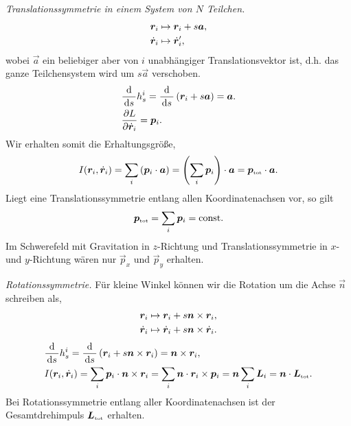 \begin{bsp}
\textit{Translationssymmetrie in einem System von $N$ Teilchen.}
\begin{align*}
&\bm{r}_i \mapsto \bm{r}_i + s\bm{a},\\
&\dot{\bm{r}}_i \mapsto \dot{\bm{r}}_i',
\end{align*}
wobei $\vec{a}$ ein beliebiger aber von $i$ unabhängiger Translationsvektor
ist, d.h. das ganze Teilchensystem wird um $s\vec{a}$ verschoben. 
\begin{align*}
&\frac{\mathrm{d}}{\,\mathrm{d} s\,} h_s^i = \frac{\mathrm{d}}{\,\mathrm{d} s\,} \left(\bm{r}_i + s\bm{a}\right)
= \bm{a}.\\
&\frac{\partial L}{\partial \dot{\bm{r}}_i} = \bm{p}_i. 
\end{align*}
Wir erhalten somit die Erhaltungsgröße,
\begin{align*}
I(\bm{r}_i,\dot{\bm{r}}_i) = \sum_i \left(\bm{p}_i\cdot \bm{a}\right) =
\left(\sum_i \bm{p}_i\right)\cdot\bm{a} = \bm{p}_{\text{\tiny tot}}\cdot\bm{a}.
\end{align*}
Liegt eine Translationssymmetrie entlang allen Koordinatenachsen vor, so	 gilt
\begin{align*}
\bm{p}_{\text{\tiny tot}} = \sum_i \bm{p}_i = \mathrm{const}.
\end{align*}
Im Schwerefeld mit Gravitation in $z$-Richtung und Translationssymmetrie in $x$-
und $y$-Richtung wären nur $\vec{p}_x$ und $\vec{p}_y$ erhalten.\bsphere
\end{bsp}
\begin{bsp}
\textit{Rotationssymmetrie.} Für kleine Winkel können wir die Rotation um
die Achse $\vec{n}$ schreiben als,
\begin{align*}
\bm{r}_i \mapsto \bm{r}_i + s\bm{n}\times\bm{r}_i,\\
\dot{\bm{r}}_i \mapsto \dot{\bm{r}}_i + s\bm{n}\times\dot{\bm{r}}_i.
\end{align*}
\begin{align*}
&\frac{\mathrm{d}}{\,\mathrm{d} s\,} h_s^i = \frac{\mathrm{d}}{\,\mathrm{d} s\,}\left(\bm{r}_i +
s\bm{n}\times\bm{r}_i\right) = \bm{n}\times\bm{r}_i,\\
& I(\bm{r}_i,\dot{\bm{r}}_i) = \sum_i \bm{p}_i \cdot \bm{n}\times \bm{r}_i =
\sum_i \bm{n}\cdot \bm{r}_i\times\bm{p}_i = \bm{n}\sum_i \bm{L}_i =
\bm{n}\cdot \bm{L}_{\text{\tiny tot}}.
\end{align*}
Bei Rotationssymmetrie entlang aller Koordinatenachsen ist der
Gesamtdrehimpuls $\bm{L}_{\text{\tiny tot}}$ erhalten.
\end{bsp}
